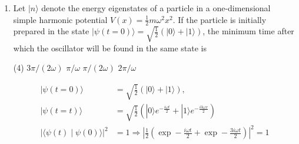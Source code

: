 \begin{enumerate}
{}
\begin{tasks}(4)
\task[\textbf{A.}] $b_{2}=0, b_{1}=1$
\task[\textbf{B.}] $b_{2}=\frac{1}{\sqrt{2}} b_{1}$
\task[\textbf{C.}] $b_{2}=\frac{1}{2} b_{1}$
\task[\textbf{D.}] $b_{2}=b_{1}$
\end{tasks}
\begin{answer}
\begin{align*}
\langle x\rangle&=b_{1}^{2}\langle 0|x| 0\rangle+b_{2}^{2}\langle 1|x| 1\rangle+2 b_{1} b_{2}\langle 0|x| 1\rangle\\
\text{	Since }\langle 0|x| 0\rangle&=0\text{ and }\langle 1|x| 1\rangle\\&=0 \Rightarrow\langle x\rangle=2 b_{1} b_{2}\langle 0|x| 1\rangle\\
\intertext{Min of $\langle x\rangle$ means $\min 2 b_{1} b_{2}$. We know that $b_{1}^{2}+b_{2}^{2}=1$}
\langle x \rangle_{min}&=\left[ \left( b_1+b_2\right)^2 -\left( b_1^2+b_2^2\right) \right] \bra{0}x\ket{1}\\&=\left[ \left( b_1+b_2\right)^2-1 \right] \bra{0}x\ket{1}\Rightarrow\left[1-\left( b_1-b_2\right)^2  \right] \bra{0}x
\ket{1}
\intertext{will be minimum and minimum value of $\left[1-\left(b_{1}-b_{2}\right)^{2}\right]$, there must be maximum of $\left(b_{1}-b_{2}\right)^{2}$, so $\Rightarrow b_{1}=b_{2}$}
\end{align*}
So the correct answer is \textbf{Option (D)}
\end{answer}
\item Let $|n\rangle$ denote the energy eigenstates of a particle in a one-dimensional simple harmonic potential $V(x)=\frac{1}{2} m \omega^{2} x^{2}$. If the particle is initially prepared in the state $|\psi(t=0)\rangle=\sqrt{\frac{1}{2}}(|0\rangle+|1\rangle)$, the minimum time after which the oscillator will be found in the same state is
{}
\begin{tasks}(4)
\task[\textbf{A.}] $3 \pi /(2 \omega)$
\task[\textbf{B.}] $\pi / \omega$
\task[\textbf{C.}] $\pi /(2 \omega)$
\task[\textbf{D.}] $2 \pi / \omega$
\end{tasks}
\begin{answer}
\begin{align*}
|\psi(t=0)\rangle&=\sqrt{\frac{1}{2}}(|0\rangle+|1\rangle), \\|\psi(t=t)\rangle&=\sqrt{\frac{1}{2}}\left(|0\rangle e^{-\frac{i \omega t}{2}}+|1\rangle e^{-\frac{i 3 \omega x}{2}}\right)\\
|\langle\psi(t) \mid \psi(0)\rangle|^{2}&=1 \Rightarrow\left|\frac{1}{2}\left(\exp -\frac{i \omega t}{2}+\exp -\frac{3 i \omega t}{2}\right)\right|^{2}=1\\

\end{align*}
\end{answer}
\end{enumerate}
